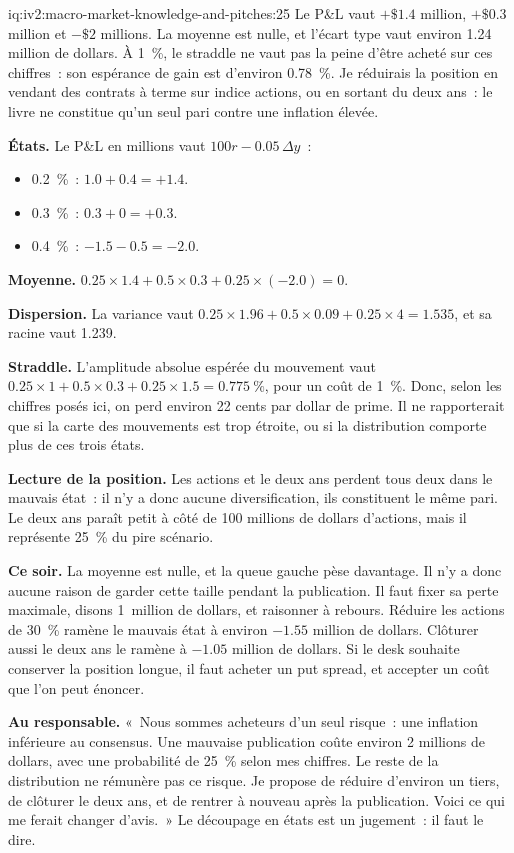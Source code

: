 \begin{solution}{iq:iv2:macro-market-knowledge-and-pitches:25}
Le P\&L vaut $+\$1.4$ million, $+\$0.3$ million et $-\$2$ millions. La moyenne est nulle, et l'écart type vaut environ 1.24 million de dollars. À 1~\%, le straddle ne vaut pas la peine d'être acheté sur ces chiffres~: son espérance de gain est d'environ 0.78~\%. Je réduirais la position en vendant des contrats à terme sur indice actions, ou en sortant du deux ans~: le livre ne constitue qu'un seul pari contre une inflation élevée.

\textbf{États.} Le P\&L en millions vaut $100r - 0.05\,\Delta y$~:
\begin{itemize}
\item 0.2~\%~: $1.0 + 0.4 = +1.4$.
\item 0.3~\%~: $0.3 + 0 = +0.3$.
\item 0.4~\%~: $-1.5 - 0.5 = -2.0$.
\end{itemize}

\textbf{Moyenne.} $0.25 \times 1.4 + 0.5 \times 0.3 + 0.25 \times (-2.0) = 0$.

\textbf{Dispersion.} La variance vaut $0.25 \times 1.96 + 0.5 \times 0.09 + 0.25 \times 4 = 1.535$, et sa racine vaut 1.239.

\textbf{Straddle.} L'amplitude absolue espérée du mouvement vaut $0.25 \times 1 + 0.5 \times 0.3 + 0.25 \times 1.5 = 0.775~\%$, pour un coût de 1~\%. Donc, selon les chiffres posés ici, on perd environ 22 cents par dollar de prime. Il ne rapporterait que si la carte des mouvements est trop étroite, ou si la distribution comporte plus de ces trois états.

\textbf{Lecture de la position.} Les actions et le deux ans perdent tous deux dans le mauvais état~: il n'y a donc aucune diversification, ils constituent le même pari. Le deux ans paraît petit à côté de 100 millions de dollars d'actions, mais il représente 25~\% du pire scénario.

\textbf{Ce soir.} La moyenne est nulle, et la queue gauche pèse davantage. Il n'y a donc aucune raison de garder cette taille pendant la publication. Il faut fixer sa perte maximale, disons 1~million de dollars, et raisonner à rebours. Réduire les actions de 30~\% ramène le mauvais état à environ $-1.55$ million de dollars. Clôturer aussi le deux ans le ramène à $-1.05$ million de dollars. Si le desk souhaite conserver la position longue, il faut acheter un put spread, et accepter un coût que l'on peut énoncer.

\textbf{Au responsable.} «~Nous sommes acheteurs d'un seul risque~: une inflation inférieure au consensus. Une mauvaise publication coûte environ 2 millions de dollars, avec une probabilité de 25~\% selon mes chiffres. Le reste de la distribution ne rémunère pas ce risque. Je propose de réduire d'environ un tiers, de clôturer le deux ans, et de rentrer à nouveau après la publication. Voici ce qui me ferait changer d'avis.~» Le découpage en états est un jugement~: il faut le dire.


\end{solution}
